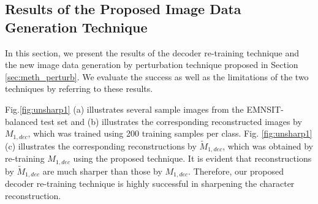 \subsection{Results of the Proposed Image Data Generation Technique}
\label{sec:results_perturb}
\newcommand{\V}[1]{\parbox[c]{0.25cm}{\texttt{[image: figures/\#1]}}}
\newcommand{\W}[1]{\parbox[c]{0.3cm}{\texttt{[image: figures/\#1]}}}

In this section, we present the results of the decoder re-training technique and the new image data generation by perturbation technique proposed in Section \ref{sec:meth_perturb}. We evaluate the success as well as the limitations of the two techniques by referring to these results. 

Fig.\ref{fig:unsharp1} (a) illustrates several sample images from the EMNSIT-balanced test set and (b) illustrates the corresponding reconstructed images by $M_{1,dec}$, which was trained using 200 training samples per class. Fig. \ref{fig:unsharp1} (c) illustrates the corresponding reconstructions by $\widetilde{M}_{1,dec}$, which was obtained by re-training $M_{1,dec}$ using the proposed technique. It is evident that reconstructions by $\widetilde{M}_{1,dec}$ are much sharper than those by $M_{1,dec}$. Therefore, our proposed decoder re-training technique is highly successful in sharpening the character reconstruction. 

